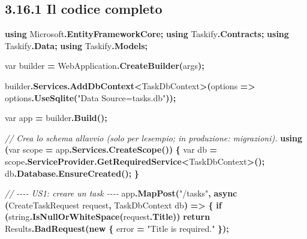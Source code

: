 \documentclass[
  italian,
  10pt,
]{book}
\newenvironment{Shaded}{\begin{snugshade}}{\end{snugshade}}
\newcommand{\CommentTok}[1]{\textcolor[rgb]{0.56,0.35,0.01}{\textit{#1}}}
\newcommand{\DataTypeTok}[1]{\textcolor[rgb]{0.13,0.29,0.53}{#1}}
\newcommand{\FunctionTok}[1]{\textcolor[rgb]{0.13,0.29,0.53}{\textbf{#1}}}
\newcommand{\KeywordTok}[1]{\textcolor[rgb]{0.13,0.29,0.53}{\textbf{#1}}}
\newcommand{\NormalTok}[1]{#1}
\newcommand{\OperatorTok}[1]{\textcolor[rgb]{0.81,0.36,0.00}{\textbf{#1}}}
\newcommand{\StringTok}[1]{\textcolor[rgb]{0.31,0.60,0.02}{#1}}
\begin{document}
\subsection{3.16.1 Il codice completo}\label{il-codice-completo-5}

\begin{Shaded}
\begin{Highlighting}[]
\KeywordTok{using}\NormalTok{ Microsoft}\OperatorTok{.}\FunctionTok{EntityFrameworkCore}\OperatorTok{;}
\KeywordTok{using}\NormalTok{ Taskify}\OperatorTok{.}\FunctionTok{Contracts}\OperatorTok{;}
\KeywordTok{using}\NormalTok{ Taskify}\OperatorTok{.}\FunctionTok{Data}\OperatorTok{;}
\KeywordTok{using}\NormalTok{ Taskify}\OperatorTok{.}\FunctionTok{Models}\OperatorTok{;}

\DataTypeTok{var}\NormalTok{ builder }\OperatorTok{=}\NormalTok{ WebApplication}\OperatorTok{.}\FunctionTok{CreateBuilder}\OperatorTok{(}\NormalTok{args}\OperatorTok{);}

\NormalTok{builder}\OperatorTok{.}\FunctionTok{Services}\OperatorTok{.}\FunctionTok{AddDbContext}\OperatorTok{\textless{}}\NormalTok{TaskDbContext}\OperatorTok{\textgreater{}(}\NormalTok{options }\OperatorTok{=\textgreater{}}
\NormalTok{    options}\OperatorTok{.}\FunctionTok{UseSqlite}\OperatorTok{(}\StringTok{"Data Source=tasks.db"}\OperatorTok{));}

\DataTypeTok{var}\NormalTok{ app }\OperatorTok{=}\NormalTok{ builder}\OperatorTok{.}\FunctionTok{Build}\OperatorTok{();}

\CommentTok{// Crea lo schema all\textquotesingle{}avvio (solo per l\textquotesingle{}esempio; in produzione: migrazioni).}
\KeywordTok{using} \OperatorTok{(}\DataTypeTok{var}\NormalTok{ scope }\OperatorTok{=}\NormalTok{ app}\OperatorTok{.}\FunctionTok{Services}\OperatorTok{.}\FunctionTok{CreateScope}\OperatorTok{())}
\OperatorTok{\{}
    \DataTypeTok{var}\NormalTok{ db }\OperatorTok{=}\NormalTok{ scope}\OperatorTok{.}\FunctionTok{ServiceProvider}\OperatorTok{.}\FunctionTok{GetRequiredService}\OperatorTok{\textless{}}\NormalTok{TaskDbContext}\OperatorTok{\textgreater{}();}
\NormalTok{    db}\OperatorTok{.}\FunctionTok{Database}\OperatorTok{.}\FunctionTok{EnsureCreated}\OperatorTok{();}
\OperatorTok{\}}

\CommentTok{// {-}{-}{-}{-} US1: creare un task {-}{-}{-}{-}}
\NormalTok{app}\OperatorTok{.}\FunctionTok{MapPost}\OperatorTok{(}\StringTok{"/tasks"}\OperatorTok{,} \FunctionTok{async} \OperatorTok{(}\NormalTok{CreateTaskRequest request}\OperatorTok{,}\NormalTok{ TaskDbContext db}\OperatorTok{)} \OperatorTok{=\textgreater{}}
\OperatorTok{\{}
    \KeywordTok{if} \OperatorTok{(}\DataTypeTok{string}\OperatorTok{.}\FunctionTok{IsNullOrWhiteSpace}\OperatorTok{(}\NormalTok{request}\OperatorTok{.}\FunctionTok{Title}\OperatorTok{))}
        \KeywordTok{return}\NormalTok{ Results}\OperatorTok{.}\FunctionTok{BadRequest}\OperatorTok{(}\KeywordTok{new} \OperatorTok{\{}\NormalTok{ error }\OperatorTok{=} \StringTok{"Title is required."} \OperatorTok{\});}


\end{Highlighting}
\end{Shaded}
\end{document}
